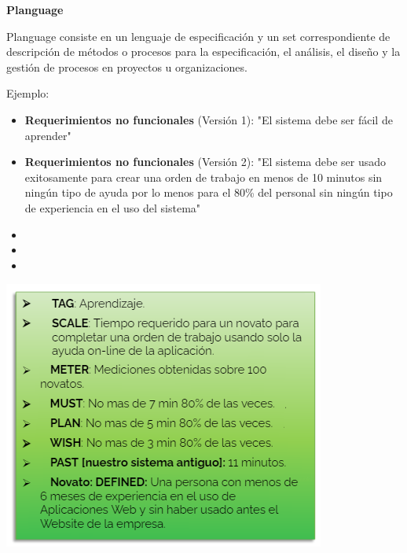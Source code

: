         \newpage
        
        \textbf{Planguage}
        
        Planguage consiste en un lenguaje de especificación y un set correspondiente de descripción de métodos o procesos para la especificación, el análisis, el diseño y la gestión de procesos en proyectos u organizaciones.
        
        Ejemplo:
        
        \begin{multicols}{2}
            \begin{itemize}
            \item \textbf{Requerimientos no funcionales} (Versión 1): 
            "El sistema debe ser fácil de aprender"
            \item \textbf{Requerimientos no funcionales} (Versión 2): 
            "El sistema debe ser usado exitosamente para crear una orden de trabajo en menos de 10 minutos sin ningún tipo de ayuda por lo menos para el 80\% del personal sin ningún tipo de experiencia en el uso del sistema"
            
            \item[]
            
            \item[]
            
            \item[]
        \end{itemize}
        
        \begin{Figure}
            \centering
            \includegraphics[width=\linewidth]{imgs/12.png}

        \end{Figure}
        \end{multicols}
    
